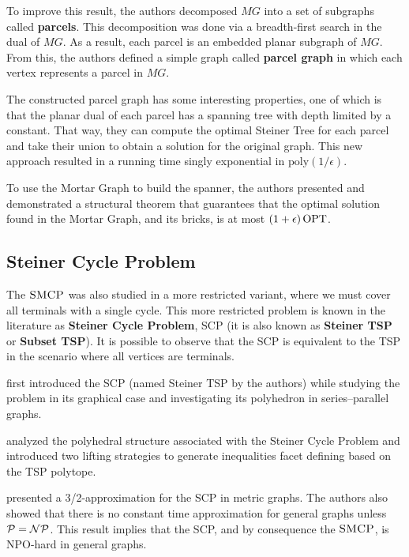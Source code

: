 To improve this result, the authors decomposed \(MG\) into a set of subgraphs called \textbf{parcels}. This decomposition was done via a breadth-first search in the dual of \(MG\). As a result, each parcel is an embedded planar subgraph of \(MG\). From this, the authors defined a simple graph called \textbf{parcel graph} in which each vertex represents a parcel in \(MG\).

The constructed parcel graph has some interesting properties, one of which is that the planar dual of each parcel has a spanning tree with depth limited by a constant. That way, they can compute the optimal Steiner Tree for each parcel and take their union to obtain a solution for the original graph. This new approach resulted in a running time singly exponential in \(\mathrm{poly}(1 / \epsilon)\).

To use the Mortar Graph to build the spanner, the authors presented and demonstrated a structural theorem that guarantees that the optimal solution found in the Mortar Graph, and its bricks, is at most \((1 + \epsilon) \operatorname{\textrm{OPT}}\).

\subsection{Steiner Cycle Problem}

The \(\textsc{SMCP}\) was also studied in a more restricted variant, where we must cover all terminals with a single cycle. This more restricted problem is known in the literature as \textbf{Steiner Cycle Problem}, SCP (it is also known as \textbf{Steiner TSP} or \textbf{Subset TSP}). It is possible to observe that the SCP is equivalent to the TSP in the scenario where all vertices are terminals.

\cite{Cornuejols1985} first introduced the SCP (named Steiner TSP by the authors) while studying the problem in its graphical case and investigating its polyhedron in series–parallel graphs.

\cite{SalazarSteinerCycle} analyzed the polyhedral structure associated with the Steiner Cycle Problem and introduced two lifting strategies to generate inequalities facet defining based on the TSP polytope.

\cite{SteinovaSteinerCycle} presented a 3/2-approximation for the SCP in metric graphs. The authors also showed that there is no constant time approximation for general graphs unless \(\mathcal{P} = \mathcal{NP}\). This result implies that the SCP, and by consequence the \(\textsc{SMCP}\), is NPO-hard in general graphs.

